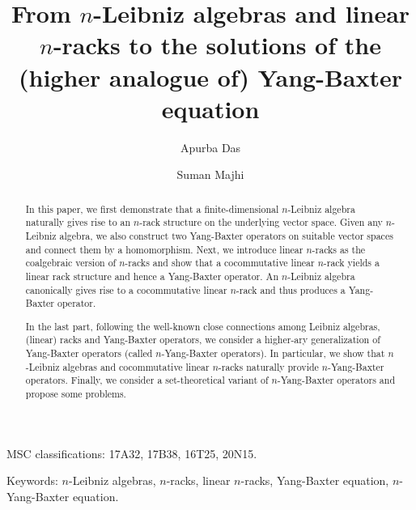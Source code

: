 \documentclass[a4paper,reqno,10pt]{amsart}
\title{}
\author{}
\date{}
\theoremstyle{plain}
\theoremstyle{definition}
\theoremstyle{remark}
\begin{document}
 
\title[]{From $n$-Leibniz algebras and linear $n$-racks to the solutions of the (higher analogue of) Yang-Baxter equation}



\author{Apurba Das}
\address{Department of Mathematics,
Indian Institute of Technology, Kharagpur 721302, West Bengal, India.}

\author{Suman Majhi}
\address{Department of Mathematics, Indian Institute of Technology, Kharagpur 721302, West Bengal, India.}



\begin{abstract}
In this paper, we first demonstrate that a finite-dimensional $n$-Leibniz algebra naturally gives rise to an $n$-rack structure on the underlying vector space. Given any $n$-Leibniz algebra, we also construct two Yang-Baxter operators on suitable vector spaces and connect them by a homomorphism. Next, we introduce linear $n$-racks as the coalgebraic version of $n$-racks and show that a cocommutative linear $n$-rack yields a linear rack structure and hence a Yang-Baxter operator. An $n$-Leibniz algebra canonically gives rise to a cocommutative linear $n$-rack and thus produces a Yang-Baxter operator.

In the last part, following the well-known close connections among Leibniz algebras, (linear) racks and Yang-Baxter operators, we consider a higher-ary generalization of Yang-Baxter operators (called $n$-Yang-Baxter operators). In particular, we show that $n$-Leibniz algebras and cocommutative linear $n$-racks naturally provide $n$-Yang-Baxter operators. Finally, we consider a set-theoretical variant of $n$-Yang-Baxter operators and propose some problems. 
\end{abstract}


\maketitle




    { MSC classifications:} 17A32, 17B38, 16T25, 20N15.

{\sf Keywords:} $n$-Leibniz algebras, $n$-racks, linear $n$-racks, Yang-Baxter equation, $n$-Yang-Baxter equation.
\end{document}
